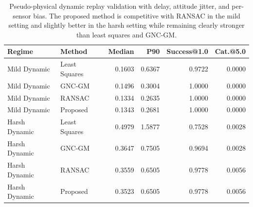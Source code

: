 \begin{table}[!htbp]
\centering
\caption{Pseudo-physical dynamic replay validation with delay, attitude jitter, and per-sensor bias. The proposed method is competitive with RANSAC in the mild setting and slightly better in the harsh setting while remaining clearly stronger than least squares and GNC-GM.}
\label{tab:pseudophysical}
\begin{tabular}{llrrrr}
\toprule
Regime & Method & Median & P90 & Success@1.0 & Cat.@5.0 \\
\midrule
Mild Dynamic  & Least Squares & 0.1603 & 0.6367 & 0.9722 & 0.0000 \\
Mild Dynamic  & GNC-GM        & 0.1496 & 0.3004 & 1.0000 & 0.0000 \\
Mild Dynamic  & RANSAC        & 0.1334 & 0.2635 & 1.0000 & 0.0000 \\
Mild Dynamic  & Proposed      & 0.1343 & 0.2681 & 1.0000 & 0.0000 \\
\midrule
Harsh Dynamic & Least Squares & 0.4979 & 1.5877 & 0.7528 & 0.0028 \\
Harsh Dynamic & GNC-GM        & 0.3647 & 0.7505 & 0.9694 & 0.0028 \\
Harsh Dynamic & RANSAC        & 0.3559 & 0.6505 & 0.9778 & 0.0056 \\
Harsh Dynamic & Proposed      & 0.3523 & 0.6505 & 0.9778 & 0.0056 \\
\bottomrule
\end{tabular}
\end{table}
